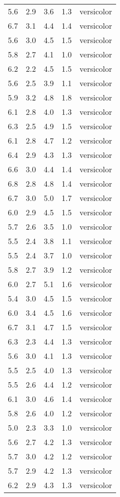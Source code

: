 \documentclass[
  letterpaper,
  DIV=11,
  numbers=noendperiod]{scrartcl}
\begin{document}
\begin{longtable}[]{@{}lrlrc@{}}
5.6 & 2.9 & 3.6 & 1.3 & versicolor \\
6.7 & 3.1 & 4.4 & 1.4 & versicolor \\
5.6 & 3.0 & 4.5 & 1.5 & versicolor \\
5.8 & 2.7 & 4.1 & 1.0 & versicolor \\
6.2 & 2.2 & 4.5 & 1.5 & versicolor \\
5.6 & 2.5 & 3.9 & 1.1 & versicolor \\
5.9 & 3.2 & 4.8 & 1.8 & versicolor \\
6.1 & 2.8 & 4.0 & 1.3 & versicolor \\
6.3 & 2.5 & 4.9 & 1.5 & versicolor \\
6.1 & 2.8 & 4.7 & 1.2 & versicolor \\
6.4 & 2.9 & 4.3 & 1.3 & versicolor \\
6.6 & 3.0 & 4.4 & 1.4 & versicolor \\
6.8 & 2.8 & 4.8 & 1.4 & versicolor \\
6.7 & 3.0 & 5.0 & 1.7 & versicolor \\
6.0 & 2.9 & 4.5 & 1.5 & versicolor \\
5.7 & 2.6 & 3.5 & 1.0 & versicolor \\
5.5 & 2.4 & 3.8 & 1.1 & versicolor \\
5.5 & 2.4 & 3.7 & 1.0 & versicolor \\
5.8 & 2.7 & 3.9 & 1.2 & versicolor \\
6.0 & 2.7 & 5.1 & 1.6 & versicolor \\
5.4 & 3.0 & 4.5 & 1.5 & versicolor \\
6.0 & 3.4 & 4.5 & 1.6 & versicolor \\
6.7 & 3.1 & 4.7 & 1.5 & versicolor \\
6.3 & 2.3 & 4.4 & 1.3 & versicolor \\
5.6 & 3.0 & 4.1 & 1.3 & versicolor \\
5.5 & 2.5 & 4.0 & 1.3 & versicolor \\
5.5 & 2.6 & 4.4 & 1.2 & versicolor \\
6.1 & 3.0 & 4.6 & 1.4 & versicolor \\
5.8 & 2.6 & 4.0 & 1.2 & versicolor \\
5.0 & 2.3 & 3.3 & 1.0 & versicolor \\
5.6 & 2.7 & 4.2 & 1.3 & versicolor \\
5.7 & 3.0 & 4.2 & 1.2 & versicolor \\
5.7 & 2.9 & 4.2 & 1.3 & versicolor \\
6.2 & 2.9 & 4.3 & 1.3 & versicolor \\

\end{longtable}
\end{document}
